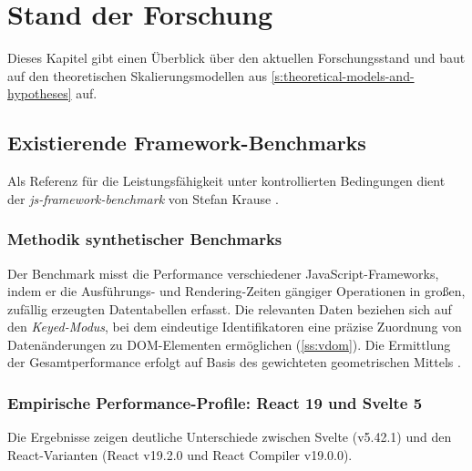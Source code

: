 \chapter{Stand der Forschung}
\label{ch:state-of-the-art}

Dieses Kapitel gibt einen Überblick über den aktuellen Forschungsstand und baut auf den theoretischen Skalierungsmodellen aus \cref{s:theoretical-models-and-hypotheses} auf.

\section{Existierende Framework-Benchmarks}
\label{s:existing-benchmarks}

Als Referenz für die Leistungsfähigkeit unter kontrollierten Bedingungen dient der \textit{js-framework-benchmark} von Stefan Krause \cite{krause-benchmark-2026}.

\subsection{Methodik synthetischer Benchmarks}
Der Benchmark misst die Performance verschiedener JavaScript-Frameworks, indem er die Ausführungs- und Rendering-Zeiten gängiger Operationen in großen, zufällig erzeugten Datentabellen erfasst. Die relevanten Daten beziehen sich auf den \textit{Keyed-Modus}, bei dem eindeutige Identifikatoren eine präzise Zuordnung von Datenänderungen zu DOM-Elementen ermöglichen (\cref{ss:vdom}). Die Ermittlung der Gesamtperformance erfolgt auf Basis des gewichteten geometrischen Mittels \cite{krause-benchmark-2026}.


\subsection{Empirische Performance-Profile: React 19 und Svelte 5}
Die Ergebnisse zeigen deutliche Unterschiede zwischen Svelte (v5.42.1) und den React-Varianten (React v19.2.0 und React Compiler v19.0.0).

